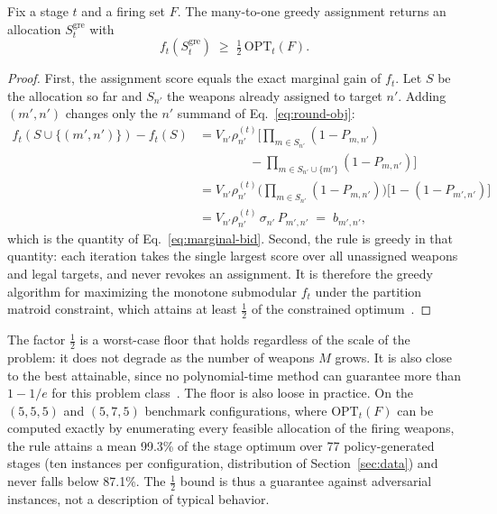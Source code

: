 \begin{proposition}
\label{prop:auction-half}
Fix a stage $t$ and a firing set $F$. The many-to-one greedy assignment returns an allocation $S^{\text{gre}}_t$ with
\begin{equation}
f_t(S^{\text{gre}}_t) \;\geq\; \tfrac12\,\text{OPT}_t(F).
\end{equation}
\end{proposition}
\begin{proof}
First, the assignment score equals the exact marginal gain of $f_t$. Let $S$ be the allocation so far and $S_{n'}$ the weapons already assigned to target $n'$. Adding $(m',n')$ changes only the $n'$ summand of Eq.~\eqref{eq:round-obj}:
\begin{align*}
f_t(S \cup \{(m',n')\}) - f_t(S)
&= V_{n'}\rho_{n'}^{(t)}\Big[\textstyle\prod_{m \in S_{n'}}(1-P_{m,n'}) \\
&\qquad\qquad - \textstyle\prod_{m \in S_{n'} \cup \{m'\}}(1-P_{m,n'})\Big] \\
&= V_{n'}\rho_{n'}^{(t)} \Big(\textstyle\prod_{m \in S_{n'}}(1-P_{m,n'})\Big)\big[1-(1-P_{m',n'})\big] \\
&= V_{n'}\rho_{n'}^{(t)}\,\sigma_{n'}\,P_{m',n'} \;=\; b_{m',n'},
\end{align*}
which is the quantity of Eq.~\eqref{eq:marginal-bid}. Second, the rule is greedy in that quantity: each iteration takes the single largest score over all unassigned weapons and legal targets, and never revokes an assignment. It is therefore the greedy algorithm for maximizing the monotone submodular $f_t$ under the partition matroid constraint, which attains at least $\tfrac12$ of the constrained optimum~\cite{fisher1978analysis}.
\end{proof}

The factor $\tfrac12$ is a worst-case floor that holds regardless of the scale of the problem: it does not degrade as the number of weapons $M$ grows. It is also close to the best attainable, since no polynomial-time method can guarantee more than $1-1/e$ for this problem class~\cite{feige1998threshold}. The floor is also loose in practice. On the $(5,5,5)$ and $(5,7,5)$ benchmark configurations, where $\text{OPT}_t(F)$ can be computed exactly by enumerating every feasible allocation of the firing weapons, the rule attains a mean 99.3\% of the stage optimum over 77 policy-generated stages (ten instances per configuration, distribution of Section~\ref{sec:data}) and never falls below 87.1\%. The $\tfrac12$ bound is thus a guarantee against adversarial instances, not a description of typical behavior.

